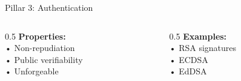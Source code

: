 \documentclass[aspectratio=169,10pt]{beamer}
\theoremstyle{plain}
\begin{document}
\begin{frame}{Pillar 3: Authentication}
   \vspace{0.5cm}
   \begin{columns}
       \begin{column}{0.5\textwidth}
           \centering
           \textbf{Properties:}\\
           • Non-repudiation\\
           • Public verifiability\\
           • Unforgeable
       \end{column}
       \begin{column}{0.5\textwidth}
           \centering
           \textbf{Examples:}\\
           • RSA signatures\\
           • ECDSA\\
           • EdDSA
       \end{column}
   \end{columns}
\end{frame}
\end{document}

